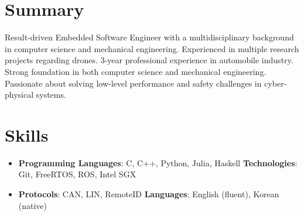 \documentclass[letterpaper,11pt]{article}
\newcommand{\resumeItem}[1]{
  \item\small{
    {#1 \vspace{-2pt}}
  }
}
\newcommand{\resumeSubHeadingListStart}{\begin{itemize}[leftmargin=*, label={}]}
\newcommand{\resumeSubHeadingListEnd}{\end{itemize}}
\begin{document}
\section{Summary}
\vspace{-2pt}
\resumeItem{Result-driven Embedded Software Engineer with a multidisciplinary background in computer science and mechanical engineering. Experienced in multiple research projects regarding drones. 3-year professional experience in automobile industry. Strong foundation in both computer science and mechanical engineering. Passionate about solving low-level performance and safety challenges in cyber-physical systems.}

\section{Skills}
 \resumeSubHeadingListStart
  \item{
    \textbf{Programming Languages}{: C, C++, Python, Julia, Haskell}
    \hfill
    \textbf{Technologies}{: Git, FreeRTOS, ROS, Intel SGX}
  }
  \item{
    \textbf{Protocols}{: CAN, LIN, RemoteID}
    \hfill
    \textbf{Languages}{: English (fluent), Korean (native)}
  }
 \resumeSubHeadingListEnd
 
\end{document}
